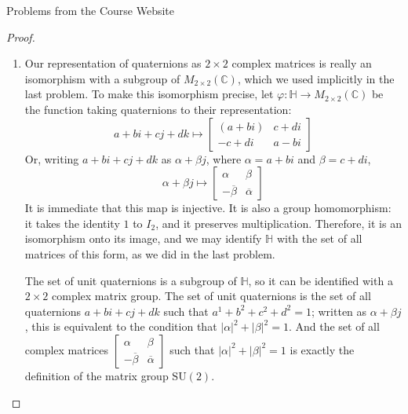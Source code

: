 \documentclass[12pt]{article}
\newcommand{\C}{\mathbb{C}}
\theoremstyle{definition}
\newenvironment{problem}[2][Problem]{\begin{trivlist}
\item[\hskip \labelsep {\bfseries #1}\hskip \labelsep {\bfseries #2.}]}{\end{trivlist}}
\begin{document}
\begin{section}{Problems from the Course Website}
\begin{problem}{3}
\begin{proof}
\begin{enumerate}[label=(\alph*)]
					\begin{align*}
					    \rho_{xy}(u) &= (xy) u \overline{xy}\\
					    &= x y u (\overline{y}) (\overline{x})\\
					    &= x (y u \overline y) \overline x\\
					    &= x (\rho_y(u) ) \overline x\\
					    &= \rho_x(\rho_y(u))\\
					    &= (\rho_{x} \circ \rho_y)(u)
					\end{align*}
					Therefore, the group of unit quaternions acts on the group of imaginary quaternions by conjugation.
				\item Our representation of quaternions as $2\times 2$ complex matrices is really an isomorphism with a subgroup of $M_{2 \times 2}(\C)$, which we used implicitly in the last problem. To make this isomorphism precise, let $\varphi: \mathbb H \to M_{2 \times 2}(\C)$ be the function taking quaternions to their representation:
				\[
                    a + bi + cj + dk \mapsto \begin{bmatrix}
                    (a + bi) & c + di \\
                    -c + di & a - bi
                    \end{bmatrix}
				\]
				Or, writing $a + bi + cj + dk$ as $\alpha + \beta j$, where $\alpha = a + bi$ and $\beta = c + di$, 
				\[
				\alpha + \beta j \mapsto \begin{bmatrix}
				\alpha & \beta \\
				- \overline \beta & \overline \alpha
				\end{bmatrix}
				\]
				It is immediate that this map is injective. It is also a group homomorphism: it takes the identity $1$ to $I_2$, and it preserves multiplication. Therefore, it is an isomorphism onto its image, and we may identify $\mathbb H$ with the set of all matrices of this form, as we did in the last
				problem.
				\par The set of unit quaternions is a subgroup of $\mathbb H$, so it can be identified with a $2 \times 2$ complex matrix group. The set of unit quaternions is the set of all quaternions $a + bi + cj + dk$ such that $a^1 + b^2 + c^2 + d^2 = 1$; written as $\alpha + \beta j$, this is equivalent to the condition that $\lvert \alpha \rvert^2 + \lvert \beta \rvert^2 = 1$. And the set of all complex matrices $\begin{bmatrix} \alpha  & \beta \\ -\overline \beta & \overline \alpha \end{bmatrix}$ such that $\lvert \alpha \rvert^2 + \lvert \beta \rvert^2 = 1$ is exactly the definition of the matrix group $\text{SU}(2)$. 

\end{enumerate}
\end{proof}
\end{problem}
\end{section}
\end{document}
